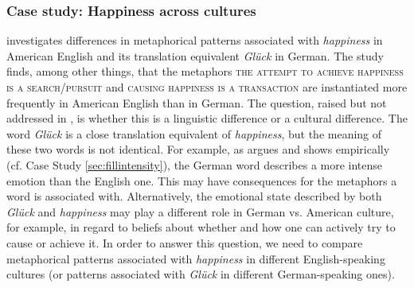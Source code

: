 
\subsubsection{Case study: Happiness across cultures}
\label{sec:happinessculture}

\citet{stefanowitsch_happiness_2004} investigates differences in metaphorical  patterns associated  with \textit{happiness}  in American  English and its translation equivalent \textit{Glück} in German. The study finds, among other things, that the metaphors  \textsc{the attempt to achieve happiness is a search\slash pursuit} and \textsc{causing happiness is a transaction} are instantiated more frequently in American English than in German. The question, raised but not addressed in \citet{stefanowitsch_happiness_2004}, is whether this is a linguistic difference or a cultural  difference. The word \textit{Glück} is a close translation equivalent of \textit{happiness},  but the meaning  of these two words is not identical. For example, as \citet{goddard_semantic_1998} argues and \citet{stefanowitsch_happiness_2004} shows empirically (cf. Case Study \ref{sec:fillintensity}), the German word describes a more intense emotion than the English one. This may have consequences for the metaphors  a word is associated  with. Alternatively, the emotional state described by both \textit{Glück} and \textit{happiness} may play a different role in German vs. American  culture,  for example, in regard to beliefs about whether and how one can actively try to cause or achieve it. In order to answer this question, we need to compare metaphorical  patterns associated  with \textit{happiness}  in different English\hyp{}speaking cultures (or patterns associated  with \textit{Glück} in different German\hyp{}speaking ones).

